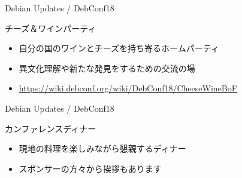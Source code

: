 \begin{frame}{Debian Updates / DebConf18}%

チーズ＆ワインパーティ
\begin{itemize}
  \item 自分の国のワインとチーズを持ち寄るホームパーティ
  \item 異文化理解や新たな発見をするための交流の場
  \item \url{https://wiki.debconf.org/wiki/DebConf18/CheeseWineBoF}
\end{itemize}


\end{frame}

\begin{frame}{Debian Updates / DebConf18}%

カンファレンスディナー

\begin{itemize}
  \item 現地の料理を楽しみながら懇親するディナー
  \item スポンサーの方々から挨拶もあります
\end{itemize}


\end{frame}



